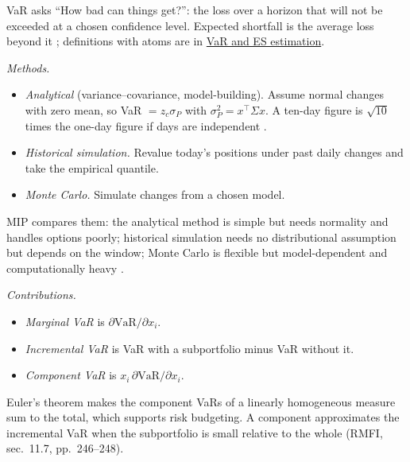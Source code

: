 \begin{qfmethod}\label{meth:portfolio-var-methods-decomposition}
 VaR asks ``How bad can things get?'': the loss over a horizon that will not be exceeded at a chosen confidence level. Expected shortfall is the average loss beyond it \citep[chap.~11, pp.~233--240]{risk-management-financial-institutions-2023}; definitions with atoms are in \hyperref[meth:var-es-estimation-methods]{VaR and ES estimation}.

\emph{Methods.}
\begin{itemize}
\item \emph{Analytical} (variance--covariance, model-building). Assume normal changes with zero mean, so VaR $=z_c\sigma_P$ with $\sigma_P^2=x^\top\Sigma x$. A ten-day figure is $\sqrt{10}$ times the one-day figure if days are independent \citep[chap.~13, sec.~13.1, pp.~279--281]{risk-management-financial-institutions-2023}.
\item \emph{Historical simulation.} Revalue today's positions under past daily changes and take the empirical quantile.
\item \emph{Monte Carlo.} Simulate changes from a chosen model.
\end{itemize}
MIP compares them: the analytical method is simple but needs normality and handles options poorly; historical simulation needs no distributional assumption but depends on the window; Monte Carlo is flexible but model-dependent and computationally heavy \citep[chap.~9, secs.~5.2.2--5.2.4, pp.~600--610]{managing-investment-portfolios-2007}.

\emph{Contributions.}
\begin{itemize}
\item \emph{Marginal VaR} is $\partial\text{VaR}/\partial x_i$.
\item \emph{Incremental VaR} is VaR with a subportfolio minus VaR without it.
\item \emph{Component VaR} is $x_i\,\partial\text{VaR}/\partial x_i$.
\end{itemize}
Euler's theorem makes the component VaRs of a linearly homogeneous measure sum to the total, which supports risk budgeting. A component approximates the incremental VaR when the subportfolio is small relative to the whole (RMFI, sec.~11.7, pp.~246--248).


\end{qfmethod}
